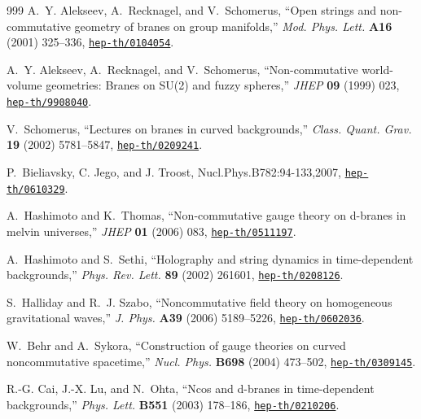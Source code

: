 \documentclass{article}
\begin{document}
\begin{thebibliography}{999}
A.~Y. Alekseev, A.~Recknagel, and V.~Schomerus, ``Open strings and
  non-commutative geometry of branes on group manifolds,'' {\em Mod. Phys.
  Lett.} {\bf A16} (2001) 325--336,
\href{http://www.arXiv.org/abs/hep-th/0104054}{{\tt hep-th/0104054}}.

A.~Y. Alekseev, A.~Recknagel, and V.~Schomerus, ``Non-commutative world-volume
  geometries: Branes on {SU}(2) and fuzzy spheres,'' {\em JHEP} {\bf 09} (1999)
  023,
\href{http://www.arXiv.org/abs/hep-th/9908040}{{\tt hep-th/9908040}}.

V.~Schomerus, ``Lectures on branes in curved backgrounds,'' {\em Class. Quant.
  Grav.} {\bf 19} (2002) 5781--5847,
\href{http://www.arXiv.org/abs/hep-th/0209241}{{\tt hep-th/0209241}}.

P.~Bieliavsky, C. Jego, and J. Troost, Nucl.Phys.B782:94-133,2007,
\href{http://www.arXiv.org/abs/hep-th/0610329}{{\tt hep-th/0610329}}.

A.~Hashimoto and K.~Thomas, ``Non-commutative gauge theory on d-branes in
  melvin universes,'' {\em JHEP} {\bf 01} (2006) 083,
\href{http://www.arXiv.org/abs/hep-th/0511197}{{\tt hep-th/0511197}}.

A.~Hashimoto and S.~Sethi, ``Holography and string dynamics in time-dependent
  backgrounds,'' {\em Phys. Rev. Lett.} {\bf 89} (2002) 261601,
\href{http://www.arXiv.org/abs/hep-th/0208126}{{\tt hep-th/0208126}}.

S.~Halliday and R.~J. Szabo, ``Noncommutative field theory on homogeneous
  gravitational waves,'' {\em J. Phys.} {\bf A39} (2006) 5189--5226,
\href{http://www.arXiv.org/abs/hep-th/0602036}{{\tt hep-th/0602036}}.

W.~Behr and A.~Sykora, ``Construction of gauge theories on curved
  noncommutative spacetime,'' {\em Nucl. Phys.} {\bf B698} (2004) 473--502,
\href{http://www.arXiv.org/abs/hep-th/0309145}{{\tt hep-th/0309145}}.

R.-G. Cai, J.-X. Lu, and N.~Ohta, ``Ncos and d-branes in time-dependent
  backgrounds,'' {\em Phys. Lett.} {\bf B551} (2003) 178--186,
\href{http://www.arXiv.org/abs/hep-th/0210206}{{\tt hep-th/0210206}}.


\end{thebibliography}
\end{document}
